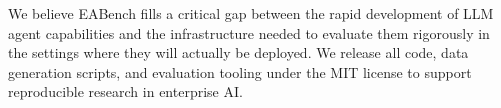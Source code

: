 \documentclass[journal,dvipsnames]{acmart}
\begin{document}
We believe EABench fills a critical gap between the rapid development of LLM
agent capabilities and the infrastructure needed to evaluate them rigorously in
the settings where they will actually be deployed.  We release all code, data
generation scripts, and evaluation tooling under the MIT license to support
reproducible research in enterprise AI.



\end{document}
